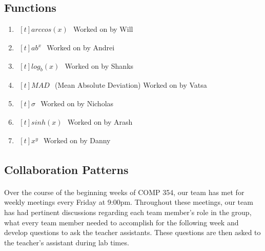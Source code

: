     \subsection{Functions}
        \begin{enumerate}
            \item $\begin{aligned}[t]
                arccos(x)
            \end{aligned}$
                Worked on by Will
            \item $\begin{aligned}[t]
                ab^x
            \end{aligned}$
                Worked on by Andrei
            \item $\begin{aligned}[t]
                log_{b}(x)
            \end{aligned}$
                Worked on by Shanks
            \item $\begin{aligned}[t]
                MAD
            \end{aligned}$
                (Mean Absolute Deviation) Worked on by Vatsa
            \item $\begin{aligned}[t]
                \sigma
            \end{aligned}$
                Worked on by Nicholas
            \item $\begin{aligned}[t]
                sinh(x)
            \end{aligned}$
                Worked on by Arash
            \item $\begin{aligned}[t]
                x^y
            \end{aligned}$
                Worked on by Danny
        \end{enumerate}
    
    \subsection{Collaboration Patterns}
        \paragraph{}
        Over the course of the beginning weeks of COMP 354, our team has met for weekly meetings every Friday at 9:00pm. Throughout these meetings, our team has had pertinent discussions regarding each team member’s role in the group, what every team member needed to accomplish for the following week and develop questions to ask the teacher assistants. These questions are then asked to the teacher’s assistant during lab times.
    

